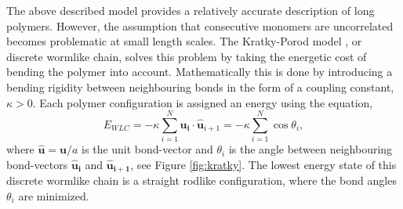 The above described model provides a relatively accurate description of long polymers.
However, the assumption that consecutive monomers are uncorrelated becomes
problematic at small length scales. The Kratky-Porod model \cite{Kratky1949}, or discrete
wormlike chain,
solves this problem by taking the energetic cost of bending the polymer into
account. Mathematically this is done by introducing a bending rigidity between
neighbouring bonds in the form of a coupling constant, $\kappa >0$. Each polymer
configuration is assigned an energy using the equation,
\begin{equation}
    E_{WLC}= -\kappa \sum_{i=1}^{N} \boldsymbol{\hat{u}_i} \cdot
    \boldsymbol{\hat{u}}_{i+1}
    = -\kappa
    \sum_{i=1}^{N} \cos\theta_i,
    \label{wlc}
\end{equation}
where $\boldsymbol{\hat{u}} = \boldsymbol{u}/a$ is the unit bond-vector and $\theta_i$ is
the angle between neighbouring bond-vectors $\boldsymbol{\hat{u}_i}$ and
$\boldsymbol{\hat{u}_{i+1}}$, see Figure \ref{fig:kratky}. The lowest energy state of
this discrete wormlike chain is
a straight rodlike configuration, where the bond angles $\theta_i$ are minimized.

